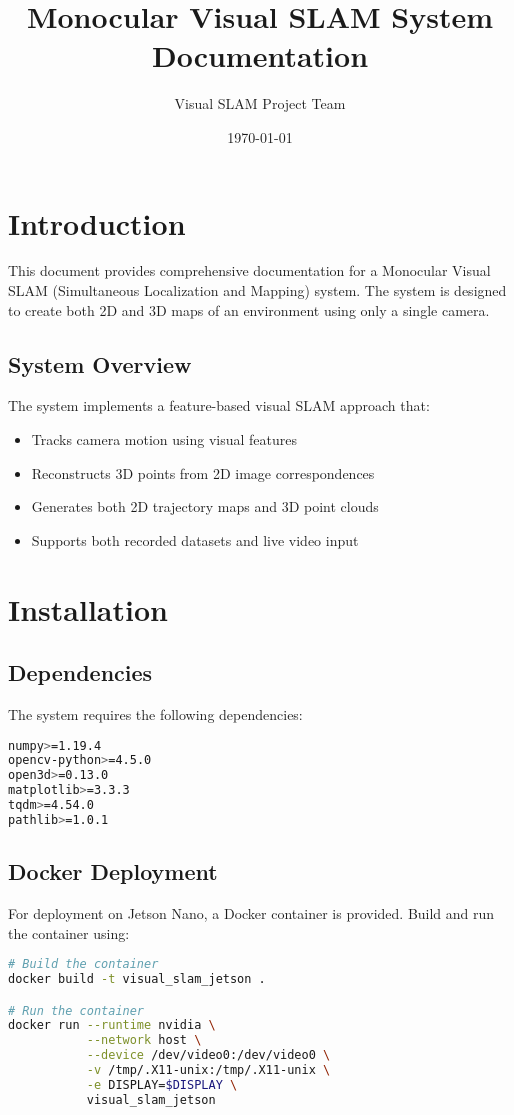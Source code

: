 \documentclass[11pt,a4paper]{article}
\title{Monocular Visual SLAM System\\
\large Documentation}
\author{Visual SLAM Project Team}
\date{\today}
\begin{document}
\maketitle
\tableofcontents
\newpage

\section{Introduction}
This document provides comprehensive documentation for a Monocular Visual SLAM (Simultaneous Localization and Mapping) system. The system is designed to create both 2D and 3D maps of an environment using only a single camera.

\subsection{System Overview}
The system implements a feature-based visual SLAM approach that:
\begin{itemize}
    \item Tracks camera motion using visual features
    \item Reconstructs 3D points from 2D image correspondences
    \item Generates both 2D trajectory maps and 3D point clouds
    \item Supports both recorded datasets and live video input
\end{itemize}

\section{Installation}
\subsection{Dependencies}
The system requires the following dependencies:
\begin{lstlisting}[language=bash]
numpy>=1.19.4
opencv-python>=4.5.0
open3d>=0.13.0
matplotlib>=3.3.3
tqdm>=4.54.0
pathlib>=1.0.1
\end{lstlisting}

\subsection{Docker Deployment}
For deployment on Jetson Nano, a Docker container is provided. Build and run the container using:
\begin{lstlisting}[language=bash]
# Build the container
docker build -t visual_slam_jetson .

# Run the container
docker run --runtime nvidia \
           --network host \
           --device /dev/video0:/dev/video0 \
           -v /tmp/.X11-unix:/tmp/.X11-unix \
           -e DISPLAY=$DISPLAY \
           visual_slam_jetson
\end{lstlisting}
\end{document}
